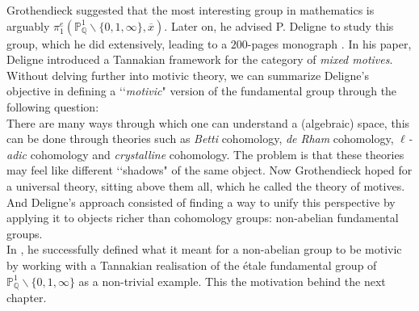 \documentclass{article}
\theoremstyle{plain}
\theoremstyle{definition}
\begin{document}
\noindent Grothendieck suggested that the most interesting group in mathematics is arguably $\pi^e_1(\mathbb{P}^1_{\mathbb{Q}} \backslash\{0,1,\infty\},\overline{x})$. 
Later on, he advised P. Deligne to study this group, which he did extensively, leading to a $200$-pages monograph \cite{droit_p_minus_3_pts}.
In his paper, Deligne introduced a Tannakian framework for the category of \textit{mixed motives}.
Without delving further into motivic theory, we can summarize Deligne’s objective in defining a ‘‘\textit{motivic}" version of the fundamental group through the following question:\\
There are many ways through which one can understand a (algebraic) space, this can be done through theories such as \textit{Betti} cohomology, \textit{de Rham} cohomology, \textit{$\ell$-adic} cohomology and \textit{crystalline} cohomology.
The problem is that these theories may feel like different ‘‘shadows" of the same object. 
Now Grothendieck hoped for a universal theory, sitting above them all, which he called the theory of motives.
And Deligne's approach consisted of finding a way to unify this perspective by applying it to objects richer than cohomology groups: non-abelian fundamental groups.\\
In \cite{droit_p_minus_3_pts}, he successfully defined what it meant for a non-abelian group to be motivic by working with a Tannakian realisation of the \'etale fundamental group of $\mathbb{P}^1_{\mathbb{Q}} \backslash \{0,1,\infty\}$ as a non-trivial example.
This the motivation behind the next chapter.









\newpage
\end{document}
